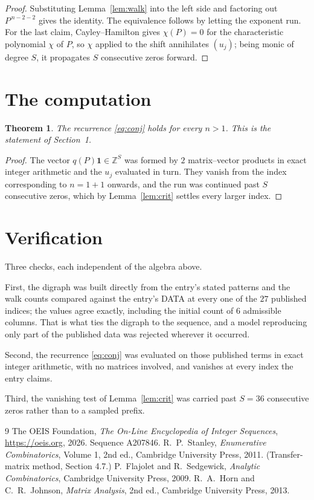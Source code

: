 \documentclass[11pt,a4paper]{article}
\theoremstyle{plain}
\newtheorem{theorem}{Theorem}
\theoremstyle{definition}
\begin{document}
\begin{proof}
Substituting Lemma~\ref{lem:walk} into the left side and factoring out
$P^{\,n-2-2}$ gives the identity. The equivalence follows by letting the exponent
run. For the last claim, Cayley--Hamilton gives $\chi(P)=0$ for the characteristic
polynomial $\chi$ of $P$, so $\chi$ applied to the shift annihilates $(u_j)$; being monic of
degree $S$, it propagates $S$ consecutive zeros forward.
\end{proof}

\section{The computation}

\begin{theorem}
The recurrence \eqref{eq:conj} holds for every $n>1$. This is the statement of
Section~1.
\end{theorem}

\begin{proof}
The vector $q(P)\mathbf{1}\in\mathbb{Z}^{S}$ was formed by $2$ matrix--vector
products in exact integer arithmetic and the $u_j$ evaluated in turn. They vanish from the
index corresponding to $n=1+1$ onwards, and the run was continued past $S$ consecutive
zeros, which by Lemma~\ref{lem:crit} settles every larger index.
\end{proof}

\section{Verification}

Three checks, each independent of the algebra above.

First, the digraph was built directly from the entry's stated patterns and the walk counts
compared against the entry's DATA at every one of the $27$ published indices; the
values agree exactly, including the initial count of $6$ admissible columns. That is
what ties the digraph to the sequence, and a model reproducing only part of the published
data was rejected wherever it occurred.

Second, the recurrence \eqref{eq:conj} was evaluated on those published terms in exact
integer arithmetic, with no matrices involved, and vanishes at every index the entry claims.

Third, the vanishing test of Lemma~\ref{lem:crit} was carried past $S=36$ consecutive
zeros rather than to a sampled prefix.

\begin{thebibliography}{9}
 The OEIS Foundation, \emph{The On-Line Encyclopedia of Integer
Sequences}, \url{https://oeis.org}, 2026. Sequence A207846.
 R.~P.~Stanley, \emph{Enumerative Combinatorics}, Volume 1, 2nd ed.,
Cambridge University Press, 2011. (Transfer-matrix method, Section 4.7.)
 P.~Flajolet and R.~Sedgewick, \emph{Analytic Combinatorics}, Cambridge
University Press, 2009.
 R.~A.~Horn and C.~R.~Johnson, \emph{Matrix Analysis}, 2nd ed., Cambridge
University Press, 2013.
\end{thebibliography}
\end{document}

